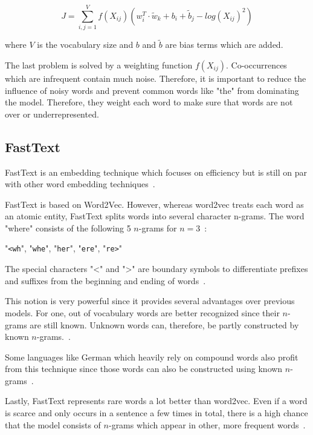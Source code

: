 \begin{equation}
    J = \sum_{i,j=1}^V f(X_{ij}) (w_i^T \cdot \widetilde{w}_k + b_i+\widetilde{b}_j - log(X_{ij})^2)
\end{equation}

where $V$ is the vocabulary size and $b$ and $\widetilde{b}$ are bias terms which are added.
\medskip

The last problem is solved by a weighting function $f(X_{ij})$. Co-occurrences which are infrequent contain much noise. Therefore, it is important to reduce the influence of noisy words and prevent common words like "the" from dominating the model. Therefore, they weight each word to make sure that words are not over or underrepresented.

\subsection{FastText}

FastText is an embedding technique which focuses on efficiency but is still on par with other word embedding techniques~\cite{Joulin2016}.
\medskip

FastText is based on Word2Vec. However, whereas word2vec treats each word as an atomic entity, FastText splits words into several character n-grams. The word "where" consists of the following 5 $n$-grams for $n=3$~\cite{Bojanowski2017}: 

\begin{center}
    "\verb|<wh|", "\verb|whe|", "\verb|her|", "\verb|ere|", "\verb|re>|"
\end{center}

The special characters "<" and ">" are boundary symbols to differentiate prefixes and suffixes from the beginning and ending of words~\cite{Bojanowski2017}.
\medskip

This notion is very powerful since it provides several advantages over previous models. For one, out of vocabulary words are better recognized since their $n$-grams are still known. Unknown words can, therefore, be partly constructed by known $n$-grams.~\cite{Bojanowski2017}. 
\medskip

Some languages like German which heavily rely on compound words also profit from this technique since those words can also be constructed using known $n$-grams~\cite{Bojanowski2017}.
\medskip

Lastly, FastText represents rare words a lot better than word2vec. Even if a word is scarce and only occurs in a sentence a few times in total, there is a high chance that the model consists of $n$-grams which appear in other, more frequent words~\cite{Bojanowski2017}.

